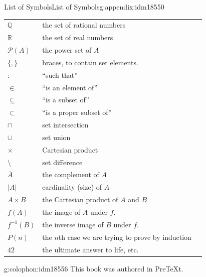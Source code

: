 \documentclass[oneside,10pt,]{book}
\numberwithin{equation}{chapter}
\def\Q{\mathbb Q}
\def\R{\mathbb R}
\def\pow{\mathcal P}
\def\inv{^{-1}}
\def\st{:}
\newcommand{\card}[1]{\left| #1 \right|}
\begin{document}
\begin{appendixptx}{List of Symbols}{}{List of Symbols}{}{}{g:appendix:idm18550}
\begin{longtable}[l]{lp{}r}
\(\Q\)&the set of rational numbers&\pageref{g:notation:idm12989}\\
\(\R\)&the set of real numbers&\pageref{g:notation:idm13000}\\
\(\pow(A)\)&the power set of \(A\)&\pageref{g:notation:idm13012}\\
\(\{, \}\)&braces, to contain set elements.&\pageref{g:notation:idm13026}\\
\(\st\)&``such that''&\pageref{g:notation:idm13037}\\
\(\in\)&``is an element of''&\pageref{g:notation:idm13048}\\
\(\subseteq\)&``is a subset of''&\pageref{g:notation:idm13069}\\
\( \subset\)&``is a proper subset of''&\pageref{g:notation:idm13084}\\
\(\cap\)&set intersection&\pageref{g:notation:idm13098}\\
\(\cup\)&set union&\pageref{g:notation:idm13113}\\
\(\times\)&Cartesian product&\pageref{g:notation:idm13129}\\
\(\setminus\)&set difference&\pageref{g:notation:idm13142}\\
\(\overline{A}\)&the complement of \(A\)&\pageref{g:notation:idm13152}\\
\(\card{A}\)&cardinality (size) of \(A\)&\pageref{g:notation:idm13163}\\
\(A\times B\)&the Cartesian product of \(A\) and \(B\)&\pageref{g:notation:idm13545}\\
\(f(A)\)&the image of \(A\) under \(f\).&\pageref{g:notation:idm14330}\\
\(f\inv(B)\)&the inverse image of \(B\) under \(f\).&\pageref{g:notation:idm14345}\\
\(P(n)\)&the \(n\)th case we are trying to prove by induction&\pageref{g:notation:idm17317}\\
\(42\)&the ultimate answer to life, etc.&\pageref{g:notation:idm17354}\\
\end{longtable}
\end{appendixptx}
%
\backmatter
%
%
\renewcommand{\leftmark}{Index}
\printindex
%
\cleardoublepage
\pagestyle{empty}
\begin{backcolophon}{g:colophon:idm18556}%
This book was authored in PreTeXt.%
\end{backcolophon}%
\end{document}
